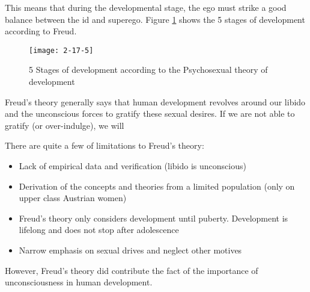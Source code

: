 \documentclass[../main/main.tex]{subfiles}
\begin{document}
This means that during the developmental stage, the ego must strike a good balance between the id and superego. Figure \ref{2-17-5} shows the 5 stages of development according to Freud.
\begin{figure}[htpb]
  \centering
  \texttt{[image: 2-17-5]}
  \caption{5 Stages of development according to the Psychosexual theory of development}
  \label{2-17-5}
\end{figure}
\begin{remark}
Freud's theory generally says that human development revolves around our libido and the unconscious forces to gratify these sexual desires. If we are not able to gratify (or over-indulge), we will
\end{remark}
There are quite a few of limitations to Freud's theory:
\begin{itemize}
\item Lack of empirical data and verification (libido is unconscious)
\item Derivation of the concepts and theories from a limited population (only on upper class Austrian women)
\item Freud's theory only considers development until puberty. Development is lifelong and does not stop after adolescence
\item Narrow emphasis on sexual drives and neglect other motives
\end{itemize}
However, Freud's theory did contribute the fact of the importance of unconsciousness in human development.
\end{document}
